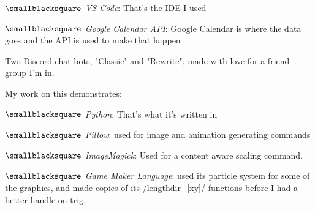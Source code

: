 \documentclass[10mm,letterpaper,notitlepage]{article}
\begin{document}
{{								$\smallblacksquare$ \textit{VS Code}: That's the IDE I used
								
								$\smallblacksquare$ \textit{Google Calendar API}: Google Calendar is where the data goes and the API is used to make that happen
								
								\setlength{\parindent}{\parindent-4mm}
							\par}
							{\color[RGB]{0, 0, 0}
							\fontsize{2.25mm}{3.0mm}\selectfont
									{\color[RGB]{108, 29, 169}
									\fontsize{4.5mm}{6.0mm}\selectfont
									\color[RGB]{96, 106, 187}{{ }}\color[RGB]{99, 94, 183}{{ }}\color[RGB]{102, 77, 178}{{ }}\color[RGB]{105, 61, 174}{{ }}
									\par}
							Two Discord chat bots, "Classic" and "Rewrite", made with love for a friend group I'm in.
							
							My work on this demonstrates:
								\setlength{\parindent}{\parindent+4mm}
								
								\nopagebreak
								$\smallblacksquare$ \textit{Python}: That's what it's written in
								
								$\smallblacksquare$ \textit{Pillow}: used for image and animation generating commands
								
								$\smallblacksquare$ \textit{ImageMagick}: Used for a content aware scaling command.
								
								$\smallblacksquare$ \textit{Game Maker Language}: used its particle system for some of the graphics, and made copies of its /lengthdir\_[xy]/ functions before I had a better handle on trig.
								
}}
\end{document}
